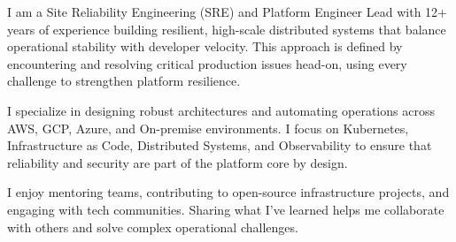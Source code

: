 

\begin{cvparagraph}

I am a Site Reliability Engineering (SRE) and Platform Engineer Lead with 12+ years of experience building resilient, high-scale distributed systems that balance operational stability with developer velocity. This approach is defined by encountering and resolving critical production issues head-on, using every challenge to strengthen platform resilience.

I specialize in designing robust architectures and automating operations across AWS, GCP, Azure, and On-premise environments. I focus on Kubernetes, Infrastructure as Code, Distributed Systems, and Observability to ensure that reliability and security are part of the platform core by design.

I enjoy mentoring teams, contributing to open-source infrastructure projects, and engaging with tech communities. Sharing what I’ve learned helps me collaborate with others and solve complex operational challenges.
\end{cvparagraph}
